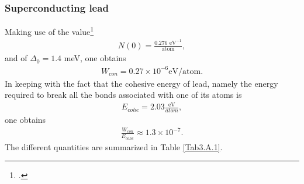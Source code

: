 \begin{subappendices}
\subsubsection{Superconducting lead}
Making use of the value\footnote{\cite{Beck:70}.}
\begin{align}\label{eqC3AppA5}
N(0)=\frac{0.276\text{ eV}^{-1}}{\text{atom}},
\end{align}
and of $\Delta_0=1.4$ meV, one obtains
\begin{align}\label{eqC3AppA6}
W_{con}=0.27\times10^{-6}\text{eV/atom}.
\end{align}
In keeping with the fact that the cohesive energy of lead, namely the energy required to break all the bonds associated with one of its atoms is
\begin{align}\label{eqC3AppA7}
E_{cohe}=2.03\frac{\text{eV}}{{atom}},
\end{align}
one obtains
\begin{align}\label{eqC3AppA8}
\frac{W_{con}}{E_{cohe}}\approx1.3\times10^{-7}.
\end{align}
The different quantities are summarized in Table \ref{Tab3.A.1}.

\end{subappendices}
